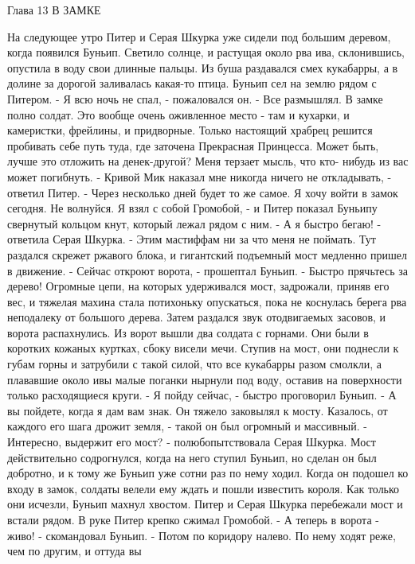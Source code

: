 Глава 13
        В ЗАМКЕ

    На следующее утро Питер и Серая Шкурка уже сидели под большим 
деревом, когда появился Буньип. Светило солнце, и растущая около рва 
ива, склонившись, опустила в воду свои длинные пальцы. Из буша 
раздавался смех кукабарры, а в долине за дорогой заливалась какая-то 
птица.
    Буньип сел на землю рядом с Питером.
    - Я всю ночь не спал, - пожаловался он. - Все размышлял. В замке 
полно солдат. Это вообще очень оживленное место - там и кухарки, и 
камеристки, фрейлины, и придворные. Только настоящий храбрец решится 
пробивать себе путь туда, где заточена Прекрасная Принцесса. Может 
быть, лучше это отложить на денек-другой? Меня терзает мысль, что кто-
нибудь из вас может погибнуть.
    - Кривой Мик наказал мне никогда ничего не откладывать, - ответил 
Питер. - Через несколько дней будет то же самое. Я хочу войти в замок 
сегодня. Не волнуйся. Я взял с собой Громобой, - и Питер показал 
Буньипу свернутый кольцом кнут, который лежал рядом с ним.
    - А я быстро бегаю! - ответила Серая Шкурка. - Этим мастиффам ни 
за что меня не поймать.
    Тут раздался скрежет ржавого блока, и гигантский подъемный мост 
медленно пришел в движение.
    - Сейчас откроют ворота, - прошептал Буньип. - Быстро прячьтесь за 
дерево!
    Огромные цепи, на которых удерживался мост, задрожали, приняв его 
вес, и тяжелая махина стала потихоньку опускаться, пока не коснулась 
берега рва неподалеку от большого дерева. Затем раздался звук 
отодвигаемых засовов, и ворота распахнулись.
    Из ворот вышли два солдата с горнами. Они были в коротких кожаных 
куртках, сбоку висели мечи. Ступив на мост, они поднесли к губам горны 
и затрубили с такой силой, что все кукабарры разом смолкли, а 
плававшие около ивы малые поганки нырнули под воду, оставив на 
поверхности только расходящиеся круги.
    - Я пойду сейчас, - быстро проговорил Буньип. - А вы пойдете, 
когда я дам вам знак.
    Он тяжело заковылял к мосту. Казалось, от каждого его шага дрожит 
земля, - такой он был огромный и массивный.
    - Интересно, выдержит его мост? - полюбопытствовала Серая Шкурка.
    Мост действительно содрогнулся, когда на него ступил Буньип, но 
сделан он был добротно, и к тому же Буньип уже сотни раз по нему 
ходил. Когда он подошел ко входу в замок, солдаты велели ему ждать и 
пошли известить короля. Как только они исчезли, Буньип махнул хвостом. 
Питер и Серая Шкурка перебежали мост и встали рядом. В руке Питер 
крепко сжимал Громобой.
    - А теперь в ворота - живо! - скомандовал Буньип. - Потом по 
коридору налево. По нему ходят реже, чем по другим, и оттуда вы 
